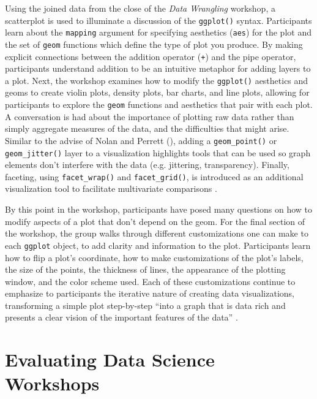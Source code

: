 \documentclass[12pt]{article}
\begin{document}
\quad Using the joined data from the close of the \emph{Data Wrangling} 
workshop, a scatterplot is used to illuminate a discussion of the
\texttt{ggplot()} syntax. Participants learn about the \texttt{mapping} argument
for specifying aesthetics (\texttt{aes}) for the plot and the set of 
\texttt{geom} functions which define the type of plot you produce. By making
explicit connections between the addition operator (\texttt{+}) and the pipe
operator, participants understand addition to be an intuitive metaphor for
adding layers to a plot. Next, the workshop examines how to modify the
\texttt{ggplot()} aesthetics and geoms to create violin plots, density plots, 
bar charts, and line plots, allowing for participants to explore the 
\texttt{geom} functions and aesthetics that pair with each plot. A conversation
is had about the importance of plotting raw data rather than simply aggregate
measures of the data, and the difficulties that might arise. Similar to the
advise of Nolan and Perrett (\citeyear{nolan-viz}), adding a 
\texttt{geom\_point()} or \texttt{geom\_jitter()} layer to a visualization
highlights tools that can be used so graph elements don't interfere with the
data (e.g. jittering, transparency). Finally, faceting, using 
\texttt{facet\_wrap()} and \texttt{facet\_grid()}, is introduced as an
additional visualization tool to facilitate multivariate comparisons
\citep[p.\ 261]{nolan-viz}. 

\quad By this point in the workshop, participants have posed many questions on
how to modify aspects of a plot that don't depend on the geom. For the final 
section of the workshop, the group walks through different customizations one 
can make to each \texttt{ggplot} object, to add clarity and information to the 
plot. Participants learn how to flip a plot's coordinate, how to make
customizations of the plot's labels, the size of the points, the thickness of
lines, the appearance of the plotting window, and the color scheme used. Each of
these customizations continue to emphasize to participants the iterative nature 
of creating data visualizations, transforming a simple plot step-by-step ``into
a graph that is data rich and presents a clear vision of the important features
of the data'' \citep[p.\ 262]{nolan-viz}.

\section{Evaluating Data Science Workshops}
\label{sec:implement}
\end{document}
